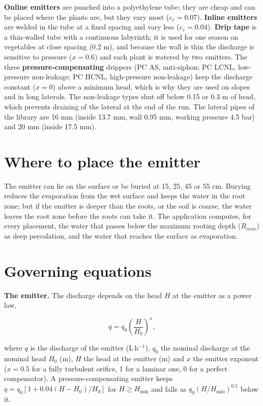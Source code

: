 \textbf{Online emitters} are punched into a polyethylene tube; they are cheap and can be placed where the plants are, but they vary most ($c_v=0.07$). \textbf{Inline emitters} are welded in the tube at a fixed spacing and vary less ($c_v=0.04$). \textbf{Drip tape} is a thin-walled tube with a continuous labyrinth; it is used for one season on vegetables at close spacing (0.2 m), and because the wall is thin the discharge is sensitive to pressure ($x=0.6$) and each plant is watered by two emitters. The three \textbf{pressure-compensating} drippers (PC AS, anti-siphon; PC LCNL, low-pressure non-leakage; PC HCNL, high-pressure non-leakage) keep the discharge constant ($x=0$) above a minimum head, which is why they are used on slopes and in long laterals. The non-leakage types shut off below 0.15 or 0.3 m of head, which prevents draining of the lateral at the end of the run. The lateral pipes of the library are 16 mm (inside 13.7 mm, wall 0.95 mm, working pressure 4.5 bar) and 20 mm (inside 17.5 mm).

\section{Where to place the emitter}
The emitter can lie on the surface or be buried at 15, 25, 45 or 55 cm. Burying reduces the evaporation from the wet surface and keeps the water in the root zone; but if the emitter is deeper than the roots, or the soil is coarse, the water leaves the root zone before the roots can take it. The application computes, for every placement, the water that passes below the maximum rooting depth ($R_{max}$) as deep percolation, and the water that reaches the surface as evaporation.

\section{Governing equations}
\textbf{The emitter.} The discharge depends on the head $H$ at the emitter as a power law,

\begin{equation}\boxed{q=q_0\left(\frac{H}{H_0}\right)^{x},}\label{eq:d-em}\end{equation}
\par\noindent where $q$ is the discharge of the emitter (L\,h$^{-1}$), $q_0$ the nominal discharge at the nominal head $H_0$ (m), $H$ the head at the emitter (m) and $x$ the emitter exponent ($x=0.5$ for a fully turbulent orifice, 1 for a laminar one, 0 for a perfect compensator). A pressure-compensating emitter keeps $q=q_0[1+0.04(H-H_0)/H_0]$ for $H\ge H_{\min}$ and falls as $q_0(H/H_{\min})^{0.5}$ below it.



